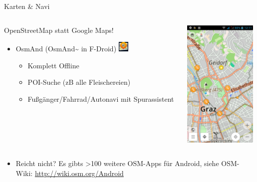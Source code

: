\documentclass{beamer}
\begin{document}
\begin{frame}{Karten \& Navi}

\begin{columns}[c]
  \begin{column}[T]{.7\textwidth}
    OpenStreetMap statt Google Maps!

    \begin{itemize}
      \item OsmAnd (OsmAnd\~{} in F-Droid)  \includegraphics[width=0.5cm]{osma.png}
      \begin{itemize}
        \item Komplett Offline
        \item POI-Suche (zB alle Fleischereien)
        \item Fußgänger/Fahrrad/Autonavi mit Spurassistent
      \end{itemize}
    \end{itemize}
  \end{column}
  \begin{column}[T]{.3\textwidth}
    \includegraphics[width=3.5cm]{osmand.png} 
   \end{column}
\end{columns}

        \pause

\begin{columns}[c]
  \begin{column}[T]{.7\textwidth}

    \vspace{-2.4cm}
      \begin{itemize}
        \item Reicht nicht? Es gibts \textgreater 100 weitere OSM-Apps für Android, siehe OSM-Wiki: \url{http://wiki.osm.org/Android}
      \end{itemize}
   \end{column}
  \begin{column}[T]{.3\textwidth}
   \end{column}
\end{columns}
\end{frame}
\end{document}
